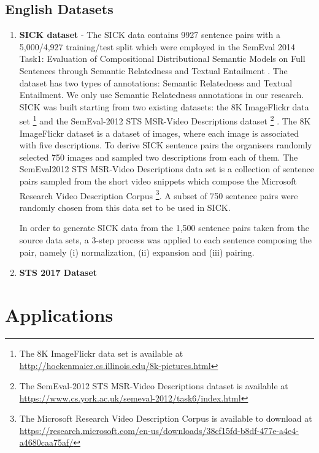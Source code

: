 \subsection{English Datasets}
\begin{enumerate}
  \item \textbf{SICK dataset} - The SICK data contains 9927 sentence pairs with a 5,000/4,927 training/test split which were employed in the SemEval 2014 Task1: Evaluation of Compositional Distributional Semantic Models on Full Sentences through Semantic Relatedness and Textual Entailment \cite{marelli-etal-2014-semeval}. The dataset has two types of annotations: Semantic Relatedness and Textual Entailment. We only use Semantic Relatedness annotations in our research. SICK was built starting from two existing datasets: the 8K ImageFlickr data set \footnote{The 8K ImageFlickr data set is available at \url{http://hockenmaier.cs.illinois.edu/8k-pictures.html}} \cite{rashtchian-etal-2010-collecting} and the SemEval-2012 STS MSR-Video Descriptions dataset \footnote{The SemEval-2012 STS MSR-Video Descriptions dataset is available at \url{https://www.cs.york.ac.uk/semeval-2012/task6/index.html}} \cite{agirre-etal-2012-semeval}. The 8K ImageFlickr dataset is a dataset of images, where each image is associated with five descriptions. To derive SICK sentence pairs the organisers randomly selected 750 images and sampled two descriptions from each of them. The SemEval2012 STS MSR-Video Descriptions data set is a collection of sentence pairs sampled from the short video snippets which compose the Microsoft Research Video Description Corpus \footnote{The Microsoft Research Video Description Corpus is available to download at \url{https://research.microsoft.com/en-us/downloads/38cf15fd-b8df-477e-a4e4-a4680caa75af/}}. A subset of 750 sentence pairs were randomly chosen from this data set to be used in SICK. 
  
  In order to generate SICK data from the 1,500 sentence pairs taken from the source data sets, a 3-step process was applied to each sentence composing the pair, namely (i) normalization, (ii) expansion and (iii) pairing.
  
  \item \textbf{STS 2017 Dataset}
  
\end{enumerate}

\section{Applications}


